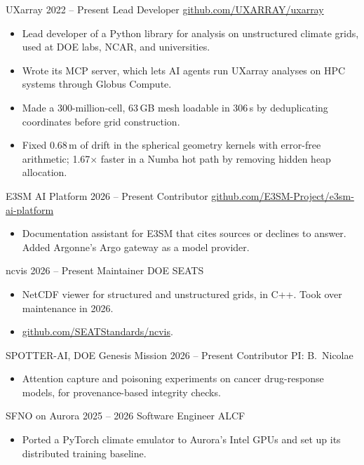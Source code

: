 \documentclass[10pt,letterpaper]{article}
\begin{document}
\entryheader
  {UXarray}
  {2022 -- Present}
  {Lead Developer}
  {\href{https://github.com/UXARRAY/uxarray}{github.com/UXARRAY/uxarray}}
\begin{itemize}
  \item Lead developer of a Python library for analysis on unstructured climate grids, used at DOE labs, NCAR, and universities.
  \item Wrote its MCP server, which lets AI agents run UXarray analyses on HPC systems through Globus Compute.
  \item Made a 300-million-cell, 63\,GB mesh loadable in 306\,s by deduplicating coordinates before grid construction.
  \item Fixed 0.68\,m of drift in the spherical geometry kernels with error-free arithmetic; 1.67$\times$ faster in a Numba hot path by removing hidden heap allocation.
\end{itemize}

\entryheader
  {E3SM AI Platform}
  {2026 -- Present}
  {Contributor}
  {\href{https://github.com/E3SM-Project/e3sm-ai-platform}{github.com/E3SM-Project/e3sm-ai-platform}}
\begin{itemize}
  \item Documentation assistant for E3SM that cites sources or declines to answer. Added Argonne's Argo gateway as a model provider.
\end{itemize}

\entryheader
  {ncvis}
  {2026 -- Present}
  {Maintainer}
  {DOE SEATS}
\begin{itemize}
  \item NetCDF viewer for structured and unstructured grids, in C++. Took over maintenance in 2026.
  \item \href{https://github.com/SEATStandards/ncvis}{github.com/SEATStandards/ncvis}.
\end{itemize}

\entryheader
  {SPOTTER-AI, DOE Genesis Mission}
  {2026 -- Present}
  {Contributor}
  {PI: B.~Nicolae}
\begin{itemize}
  \item Attention capture and poisoning experiments on cancer drug-response models, for provenance-based integrity checks.
\end{itemize}

\entryheader
  {SFNO on Aurora}
  {2025 -- 2026}
  {Software Engineer}
  {ALCF}
\begin{itemize}
  \item Ported a PyTorch climate emulator to Aurora's Intel GPUs and set up its distributed training baseline.
\end{itemize}
\end{document}
